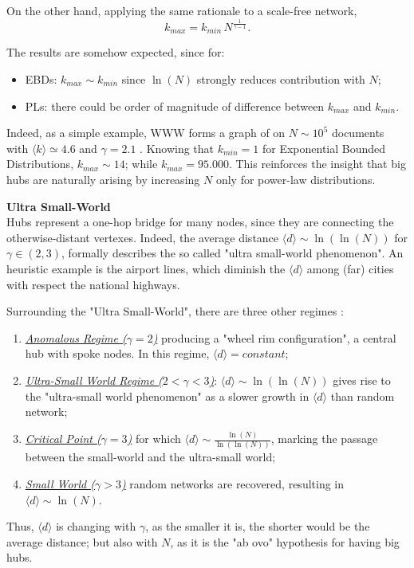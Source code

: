 \documentclass[a4paper,10pt, oneside]{book} %
\theoremstyle{definition}
\begin{document}
On the other hand, applying the same rationale to a scale-free network, 
\begin{equation}
	k_{max} = k_{min}\,N^{\frac{1}{\gamma-1}}.
	\label{eq:SFkmax_up}
\end{equation}

The results are somehow expected, since for:
\begin{itemize}
	\item EBDs: $k_{max} \sim k_{min}$ since $\ln(N)$ strongly reduces contribution with $N$;
	\item PLs: there could be order of magnitude of difference between $k_{max}$ and $k_{min}$.
\end{itemize} 
Indeed, as a simple example, WWW forms a graph of on $N \sim 10^5$ documents with $\langle k \rangle \simeq 4.6$ and $\gamma = 2.1$ \cite{barabasi::2016networkbook}. 
Knowing that $k_{min} = 1$ for Exponential Bounded Distributions, $k_{max} \sim 14$; while $k_{max} = 95.000$. 
This reinforces the insight that big hubs are naturally arising by increasing $N$ only for power-law distributions.
\label{sec:SFProperties_up}

{\large \textbf{Ultra Small-World}} \\
Hubs represent a one-hop bridge for many nodes, since they are connecting the otherwise-distant vertexes. Indeed, the average distance $\langle d \rangle \sim \ln(\ln(N))$ for $\gamma \in (2,3)$, formally describes the so called "ultra small-world phenomenon". An heuristic example is the airport lines, which diminish the \(\langle d \rangle\) among (far) cities with respect the national highways.

Surrounding the "Ultra Small-World", there are three other regimes
\cite{Cohen:2003_SFUSW}:
\begin{enumerate}
	\item \underline{\textit{Anomalous Regime ($\gamma = 2$)}} producing a "wheel rim configuration", 
	a central hub with spoke nodes. In this regime, $\langle d \rangle = constant$;
	\item \underline{\textit{Ultra-Small World Regime ($2 < \gamma < 3$)}}: $\langle d \rangle \sim \ln(\ln(N))$ gives rise to the "ultra-small world phenomenon" as a slower growth in $\langle d \rangle$ than random network;
	\item \underline{\textit{Critical Point ($\gamma = 3$)}} for which $\langle d \rangle \sim \frac{\ln(N)}{\ln(\ln(N))}$, marking the passage between the small-world and the ultra-small world;
	\item \underline{\textit{Small World ($\gamma > 3$)}} random networks are recovered, resulting in $\langle d \rangle \sim \ln(N)$.
\end{enumerate}
Thus, \(\langle d \rangle\) is changing with $\gamma$, as the smaller it is, the shorter would be the average distance; but also with $N$, as it is the "ab ovo" hypothesis for having big hubs.
\end{document}
